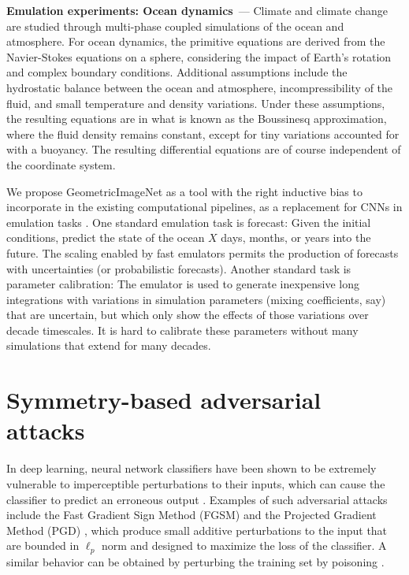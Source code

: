 \documentclass[10pt]{article}
\renewcommand{\paragraph}[1]{\smallskip\par\noindent\textbf{#1}~---}
\begin{document}
\paragraph{Emulation experiments: Ocean dynamics}
Climate and climate change are studied through multi-phase coupled simulations of the ocean and atmosphere.
For ocean dynamics, the primitive equations are derived from the Navier-Stokes equations on a sphere, considering the impact of Earth's rotation and complex boundary conditions.
Additional assumptions include the hydrostatic balance between the ocean and atmosphere, incompressibility of the fluid, and small temperature and density variations.
Under these assumptions, the resulting equations are in what is known as the Boussinesq approximation, where the fluid density remains constant, except for tiny variations accounted for with a buoyancy.
The resulting differential equations are of course independent of the coordinate system.

We propose GeometricImageNet as a tool with the right inductive bias to incorporate in the existing computational pipelines, as a replacement for CNNs in emulation tasks \cite{bolton2019applications}.
One standard emulation task is forecast:
Given the initial conditions, predict the state of the ocean $X$ days, months, or years into the future.
The scaling enabled by fast emulators permits the production of forecasts with uncertainties (or probabilistic forecasts).
Another standard task is parameter calibration:
The emulator is used to generate inexpensive long integrations with variations in simulation parameters (mixing coefficients, say) that are uncertain, but which only show the effects of those variations over decade timescales.
It is hard to calibrate these parameters without many simulations that extend for many decades.

\section{Symmetry-based adversarial attacks}

In deep learning, neural network classifiers have been shown to be extremely vulnerable to imperceptible perturbations to their inputs, which can cause the classifier to predict an erroneous output \cite{biggio2013evasion, szegedy2013intriguing, goodfellow2014explaining}. Examples of such adversarial attacks include the Fast Gradient Sign Method (FGSM)  \cite{goodfellow2014explaining} and the Projected Gradient Method (PGD) \cite{madry2017towards}, which produce small additive perturbations to the input that are bounded in $\ell_p$ norm and designed to maximize the loss of the classifier. A similar behavior can be obtained by perturbing the training set by poisoning \cite{shafahi2018poison, metzen2017detecting}.
\end{document}
